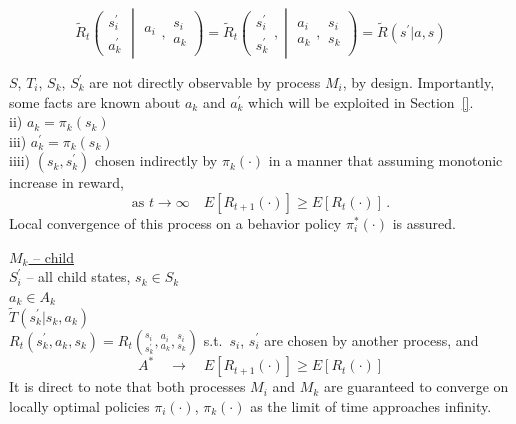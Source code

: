 
\begin{equation*}
\tilde{R}_t\left(  \begin{array}{l} s^\prime_i \\ a^\prime_k \end{array}
\middle| 
\begin{array}{c}  a_i \\ \end{array},
\begin{array}{c} s_i \\ a_k \end{array}
\right) 
=
\tilde{R}_t\left( 
\begin{array}{c} s^\prime_i \\ s^\prime_k \end{array}, \middle|
\begin{array}{c} a_i \\ a_k \end{array},
\begin{array}{c} s_i \\ s_k \end{array}
\right)
=
\tilde{R}( s^\prime | a, s )
\end{equation*}


$S$, $T_i$, $S_k$, $S^\prime_k$ are not directly observable by process $M_i$, by design. Importantly, some facts are known about $a_k$ and $a^\prime_k$ which will be exploited in Section~\ref{}.\\

ii) $a_k=\pi_k(s_k)$\\
iii) $a^\prime_k=\pi_k(s_k)$\\
iiii) $\left(s_k,s^\prime_k\right)$ chosen indirectly by $\pi_k(\cdot)$ in a manner that assuming monotonic increase in reward,
\begin{equation*}
  \text{as\ }t \to \infty \quad E[R_{t+1}(\cdot)] \geq E[R_t(\cdot)]\,.
\end{equation*}
Local convergence of this process on a behavior policy $\pi^*_i(\cdot)$ is assured.

\underline{$M_k$ -- child}\\

$S^\prime_i$ -- all child states, $s_k\in S_k$\\
$a_k\in A_k$\\
$\tilde{T}(s^\prime_k|s_k,a_k)$\\
$R_t(s^\prime_k,a_k,s_k)=R_t\left({}^{s_i}_{s^\prime_k},{}^{a_i}_{a_k},{}^{s_i}_{s_k}\right)$
s.t.\ $s_i$, $s^\prime_i$ are chosen by another process, and
\begin{equation*}
\boxed{A^*}\quad\longrightarrow\quad E[R_{t+1}(\cdot)]\geq E[R_t(\cdot)]
\end{equation*}
It is direct to note that both processes $M_i$ and $M_k$ are guaranteed to converge on locally optimal policies $\pi_i(\cdot)$, $\pi_k(\cdot)$ as the limit of time approaches infinity. 

